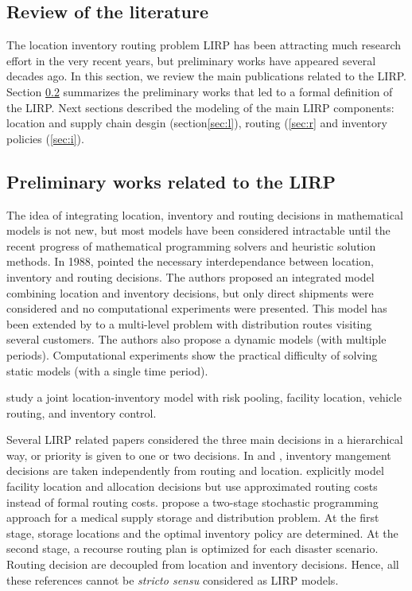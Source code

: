 \documentclass[a4paper,10pt]{article}
\begin{document}
\begin{linenumbers}
\subsection{Review of the literature}

The location inventory routing problem LIRP has been attracting much research effort in the very recent years, but preliminary works have appeared several decades ago.  
In this section, we review the main publications related to the LIRP.
Section \ref{sec:almost} summarizes the preliminary works that led to a formal definition of the LIRP. 
Next sections described the modeling of the main LIRP components: location and supply chain desgin (section\ref{sec:l}), 
routing (\ref{sec:r} and inventory policies (\ref{sec:i}). 

\subsection{Preliminary works related to the LIRP}
\label{sec:almost}

 The idea of integrating location, inventory and routing decisions in mathematical models is not new, but most models have been considered intractable until the recent progress of mathematical programming solvers and heuristic solution methods. 
In 1988, \cite{PerSir88} pointed the necessary interdependance between location, inventory and routing decisions. 
The authors proposed an integrated model combining location and inventory decisions, but only direct shipments were considered and no computational experiments were presented. 
This model has been extended by \cite{AmbScu05} to a multi-level problem with distribution routes visiting several customers. The authors also propose a dynamic models (with multiple periods). Computational experiments show the practical difficulty of solving static models (with a single time period). 

\cite{DasCShen02} study a joint location-inventory model with risk pooling, facility location, vehicle routing, and inventory control.

Several LIRP related papers considered the three main decisions in a hierarchical way, or priority is given to one or two decisions. 
In \cite{LiuLee03} and \cite{LiuLin05}, inventory mangement decisions are taken independently from routing and location. 
\cite{Shen07} explicitly model facility location and allocation decisions but use approximated routing costs instead of formal routing costs. 
\cite{MetZab10} propose a two-stage stochastic programming approach for a medical supply
storage and distribution problem.
At the first stage, storage locations and the optimal inventory policy are determined. 
At the second stage, a recourse routing plan is optimized for each disaster scenario. 
Routing decision are decoupled from location and inventory decisions. 
Hence, all these references cannot be \textit{stricto sensu} considered as LIRP models. 


\end{linenumbers}
\end{document}
